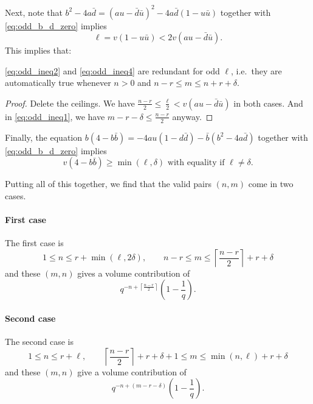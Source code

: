 Next, note that
$b^2-4a\bar d = (au - \bar d \bar u)^2 - 4a \bar d (1-u \bar u)$
together with \eqref{eq:odd_b_d_zero} implies
\begin{equation}
  \ell = v(1-u \bar u) < 2v(au - \bar d \bar u).
  \label{eq:odd_center_distance}
\end{equation}
This implies that:
\begin{fact}
  \eqref{eq:odd_ineq2} and \eqref{eq:odd_ineq4} are redundant for odd $\ell$,
  i.e.\ they are automatically true whenever $n > 0$ and $n-r \le m \le n+r+\delta$.
\end{fact}
\begin{proof}
  Delete the ceilings.
  We have $\frac{n-r}{2} \le \frac{\ell}{2} < v(au - \bar d \bar u)$ in both cases.
  And in \eqref{eq:odd_ineq1}, we have $m-r-\delta \le \frac{n-r}{2}$ anyway.
\end{proof}

Finally, the equation $b(4-b \bar b) = -4au(1-d\bar d) - \bar b(b^2-4a\bar d)$
together with \eqref{eq:odd_b_d_zero} implies
\begin{equation}
  v(4-b\bar b) \ge \min(\ell,\delta) \text{ with equality if } \ell \neq \delta.
  \label{eq:odd_bb}
\end{equation}

Putting all of this together,
we find that the valid pairs $(n,m)$ come in two cases.

\paragraph{First case}
The first case is
\begin{equation}
  1 \leq n \leq r + \min(\ell, 2\delta),
  \qquad n-r \leq m \leq \left\lceil \frac{n-r}{2} \right\rceil+r+\delta
  \label{eq:odd_range1}
\end{equation}
and these $(m,n)$ gives a volume contribution of
\[ q^{-n + \left\lceil \frac{n-r}{2} \right\rceil} \left( 1 - \frac 1q \right). \]

\paragraph{Second case}
The second case is
\begin{equation}
  1 \leq n \leq r + \ell,
  \qquad \left\lceil \frac{n-r}{2} \right\rceil+r+\delta+1
    \leq m \leq \min(n,\ell)+r+\delta
  \label{eq:odd_range2}
\end{equation}
and these $(m,n)$ give a volume contribution of
\[ q^{-n + (m-r-\delta)} \left( 1 - \frac 1q \right). \]

